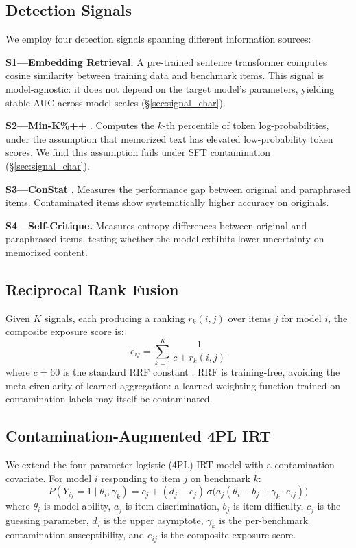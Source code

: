 \documentclass[11pt,a4paper]{article}
\begin{document}
\subsection{Detection Signals}

We employ four detection signals spanning different information sources:

\textbf{S1---Embedding Retrieval.} A pre-trained sentence transformer computes cosine similarity between training data and benchmark items.
This signal is model-agnostic: it does not depend on the target model's parameters, yielding stable AUC across model scales (\S\ref{sec:signal_char}).

\textbf{S2---Min-K\%++} \citep{shi2024detecting}. Computes the $k$-th percentile of token log-probabilities, under the assumption that memorized text has elevated low-probability token scores.
We find this assumption fails under SFT contamination (\S\ref{sec:signal_char}).

\textbf{S3---ConStat} \citep{yang2023rethinking}. Measures the performance gap between original and paraphrased items. Contaminated items show systematically higher accuracy on originals.

\textbf{S4---Self-Critique.} Measures entropy differences between original and paraphrased items, testing whether the model exhibits lower uncertainty on memorized content.

\subsection{Reciprocal Rank Fusion}

Given $K$ signals, each producing a ranking $r_k(i,j)$ over items $j$ for model $i$, the composite exposure score is:
\begin{equation}
e_{ij} = \sum_{k=1}^{K} \frac{1}{c + r_k(i,j)}
\label{eq:rrf}
\end{equation}
where $c=60$ is the standard RRF constant \citep{cormack2009reciprocal}.
RRF is training-free, avoiding the meta-circularity of learned aggregation: a learned weighting function trained on contamination labels may itself be contaminated.

\subsection{Contamination-Augmented 4PL IRT}
\label{sec:irt_model}

We extend the four-parameter logistic (4PL) IRT model with a contamination covariate.
For model $i$ responding to item $j$ on benchmark $k$:
\begin{equation}
P(Y_{ij} = 1 \mid \theta_i, \gamma_k) = c_j + (d_j - c_j)\,\sigma\!\bigl(a_j(\theta_i - b_j + \gamma_k \cdot e_{ij})\bigr)
\label{eq:4pl_gamma}
\end{equation}
where $\theta_i$ is model ability, $a_j$ is item discrimination, $b_j$ is item difficulty, $c_j$ is the guessing parameter, $d_j$ is the upper asymptote, $\gamma_k$ is the per-benchmark contamination susceptibility, and $e_{ij}$ is the composite exposure score.
\end{document}
